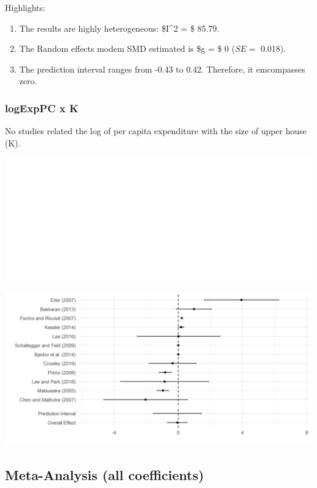 \documentclass[
]{article}
\providecommand{\tightlist}{%
  \setlength{\itemsep}{0pt}\setlength{\parskip}{0pt}}
\begin{document}
Highlights:

\begin{enumerate}
\def\labelenumi{\arabic{enumi}.}
\tightlist
\item
  The results are highly heterogeneous: \$I\^{}2 = \$ 85.79.
\item
  The Random effects modem SMD estimated is \$g = \$ 0 (\(SE =\) 0.018).
\item
  The prediction interval ranges from -0.43 to 0.42. Therefore, it
  emcompasses zero.
\end{enumerate}

\newpage

\hypertarget{logexppc-x-k}{%
\subsubsection{logExpPC x K}\label{logexppc-x-k}}

No studies related the log of per capita expenditure with the size of
upper house (K).

\includegraphics{appendixV5_files/figure-latex/unnamed-chunk-30-2.pdf}

\includegraphics[width=20.21in]{plots/f1.png}


\newpage

\hypertarget{meta-analysis-all-coefficients}{%
\subsection{Meta-Analysis (all
coefficients)}\label{meta-analysis-all-coefficients}}
\end{document}
